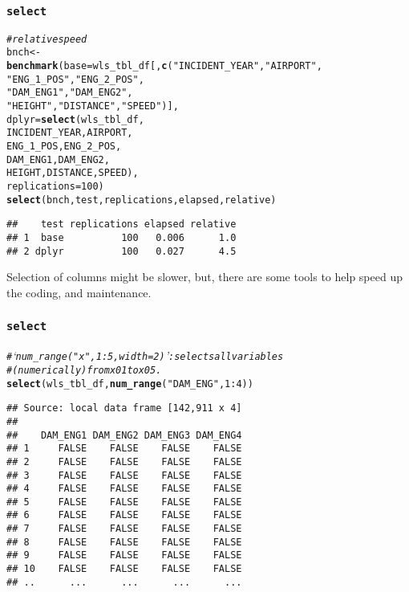 \documentclass{beamer}\usepackage[]{graphicx}\usepackage[]{color}
\makeatletter
\newcommand{\hlnum}[1]{\textcolor[rgb]{0.686,0.059,0.569}{#1}}%
\newcommand{\hlstr}[1]{\textcolor[rgb]{0.192,0.494,0.8}{#1}}%
\newcommand{\hlcom}[1]{\textcolor[rgb]{0.678,0.584,0.686}{\textit{#1}}}%
\newcommand{\hlopt}[1]{\textcolor[rgb]{0,0,0}{#1}}%
\newcommand{\hlstd}[1]{\textcolor[rgb]{0.345,0.345,0.345}{#1}}%
\newcommand{\hlkwb}[1]{\textcolor[rgb]{0.69,0.353,0.396}{#1}}%
\newcommand{\hlkwc}[1]{\textcolor[rgb]{0.333,0.667,0.333}{#1}}%
\newcommand{\hlkwd}[1]{\textcolor[rgb]{0.737,0.353,0.396}{\textbf{#1}}}%
\newenvironment{kframe}{%
 \def\at@end@of@kframe{}%
 \ifinner\ifhmode%
  \def\at@end@of@kframe{\end{minipage}}%
  \begin{minipage}{\columnwidth}%
 \fi\fi%
 \def\FrameCommand##1{\hskip\@totalleftmargin \hskip-\fboxsep
 \colorbox{shadecolor}{##1}\hskip-\fboxsep
     \hskip-\linewidth \hskip-\@totalleftmargin \hskip\columnwidth}%
 \MakeFramed {\advance\hsize-\width
   \@totalleftmargin\z@ \linewidth\hsize
   \@setminipage}}%
 {\par\unskip\endMakeFramed%
 \at@end@of@kframe}
\newenvironment{knitrout}{}{} %
\makeatother
\begin{document}
\begin{frame}[fragile]
  \frametitle{{\tt select}}
\begin{knitrout}\footnotesize
{}\color{fgcolor}\begin{kframe}
\begin{alltt}
\hlcom{# relative speed }
\hlstd{bnch} \hlkwb{<-}
  \hlkwd{benchmark}\hlstd{(}\hlkwc{base}  \hlstd{= wls_tbl_df[,} \hlkwd{c}\hlstd{(}\hlstr{"INCIDENT_YEAR"}\hlstd{,} \hlstr{"AIRPORT"}\hlstd{,}
                                   \hlstr{"ENG_1_POS"}\hlstd{,} \hlstr{"ENG_2_POS"}\hlstd{,}
                                   \hlstr{"DAM_ENG1"}\hlstd{,} \hlstr{"DAM_ENG2"}\hlstd{,}
                                   \hlstr{"HEIGHT"}\hlstd{,} \hlstr{"DISTANCE"}\hlstd{,} \hlstr{"SPEED"}\hlstd{)],}
            \hlkwc{dplyr} \hlstd{=} \hlkwd{select}\hlstd{(wls_tbl_df,}
                           \hlstd{INCIDENT_YEAR, AIRPORT,}
                           \hlstd{ENG_1_POS, ENG_2_POS,}
                           \hlstd{DAM_ENG1, DAM_ENG2,}
                           \hlstd{HEIGHT, DISTANCE, SPEED),}
            \hlkwc{replications} \hlstd{=} \hlnum{100}\hlstd{)}
\hlkwd{select}\hlstd{(bnch, test, replications, elapsed, relative)}
\end{alltt}
\begin{verbatim}
##    test replications elapsed relative
## 1  base          100   0.006      1.0
## 2 dplyr          100   0.027      4.5
\end{verbatim}
\end{kframe}
\end{knitrout}

Selection of columns might be slower, but, there are some
tools to help speed up the coding, and maintenance.
\end{frame} 


\begin{frame}[fragile]
  \frametitle{{\tt select}}
\begin{knitrout}\footnotesize
{}\color{fgcolor}\begin{kframe}
\begin{alltt}
\hlcom{# ‘num_range("x", 1:5, width = 2)’: selects all variables}
\hlcom{# (numerically) from x01 to x05.}
\hlkwd{select}\hlstd{(wls_tbl_df,} \hlkwd{num_range}\hlstd{(}\hlstr{"DAM_ENG"}\hlstd{,} \hlnum{1}\hlopt{:}\hlnum{4}\hlstd{))}
\end{alltt}
\begin{verbatim}
## Source: local data frame [142,911 x 4]
## 
##    DAM_ENG1 DAM_ENG2 DAM_ENG3 DAM_ENG4
## 1     FALSE    FALSE    FALSE    FALSE
## 2     FALSE    FALSE    FALSE    FALSE
## 3     FALSE    FALSE    FALSE    FALSE
## 4     FALSE    FALSE    FALSE    FALSE
## 5     FALSE    FALSE    FALSE    FALSE
## 6     FALSE    FALSE    FALSE    FALSE
## 7     FALSE    FALSE    FALSE    FALSE
## 8     FALSE    FALSE    FALSE    FALSE
## 9     FALSE    FALSE    FALSE    FALSE
## 10    FALSE    FALSE    FALSE    FALSE
## ..      ...      ...      ...      ...
\end{verbatim}
\end{kframe}
\end{knitrout}
\end{frame} 
\end{document}
